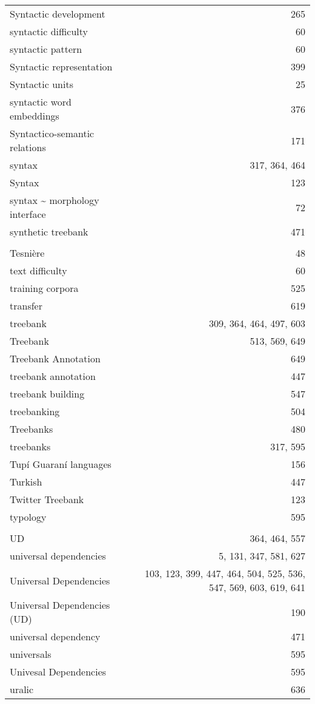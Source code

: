 \documentclass{easychair}
\begin{document}
\begin{longtable}{lp{7em}r}
Syntactic development & & 265 
\\
syntactic difficulty & & 60 
\\
syntactic pattern & & 60 
\\
Syntactic representation & & 399 
\\
Syntactic units & & 25 
\\
syntactic word embeddings & & 376 
\\
Syntactico-semantic relations & & 171 
\\
syntax & & 317, 364, 464 
\\
Syntax & & 123 
\\
syntax \~{} morphology interface & & 72 
\\
synthetic treebank & & 471 
\\
\\
Tesni\`ere & & 48 
\\
text difficulty & & 60 
\\
training corpora & & 525 
\\
transfer & & 619 
\\
treebank & & 309, 364, 464, 497, 603 
\\
Treebank & & 513, 569, 649 
\\
Treebank Annotation & & 649 
\\
treebank annotation & & 447 
\\
treebank building & & 547 
\\
treebanking & & 504 
\\
Treebanks & & 480 
\\
treebanks & & 317, 595 
\\
Tup\'i Guaran\'i languages & & 156 
\\
Turkish & & 447 
\\
Twitter Treebank & & 123 
\\
typology & & 595 
\\
\\
UD & & 364, 464, 557 
\\
universal dependencies & & 5, 131, 347, 581, 627 
\\
Universal Dependencies & & 103, 123, 399, 447, 464, 504, 525, 536, 547, 569, 603, 619, 641 
\\
Universal Dependencies (UD) & & 190 
\\
universal dependency & & 471 
\\
universals & & 595 
\\
Univesal Dependencies & & 595 
\\
uralic & & 636 
\\

\end{longtable}
\end{document}
